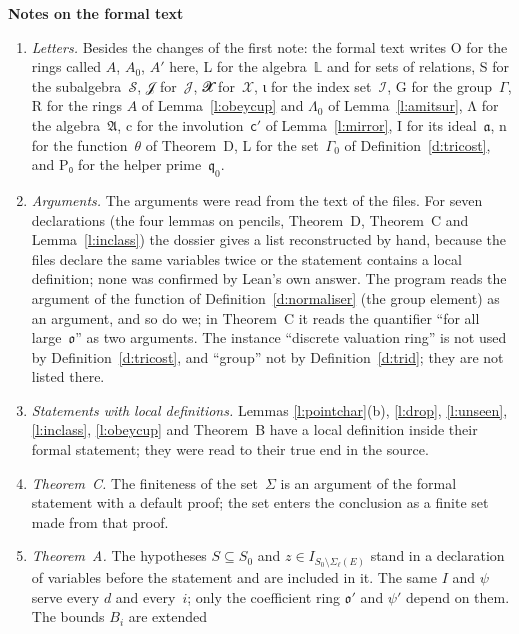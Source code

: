 \documentclass[11pt,a4paper]{article}
\newcommand{\leanfont}{\ttfamily\fontsize{8.6}{10.5}\selectfont\color{leancol}}
\newcommand{\m}[1]{\mbox{$#1$}}        %
\newcommand{\sect}[2]{\refstepcounter{section}\label{#2}\par\addvspace{19pt plus 4pt minus 2pt}\Needspace{7\baselineskip}%
  \noindent\llap{{\fontsize{13.2}{16}\selectfont\bfseries\color{inkfaint}\thesection}\hspace{9pt}}%
  {\fontsize{13.2}{16}\selectfont\bfseries\color{ink}#1}\par\nopagebreak\vspace{-1pt}}
\theoremstyle{plainx}
\theoremstyle{uprightx}
\newcommand{\pd}[2]{\Sigma_{#2}(#1)}
\newcommand{\inab}[1]{I_{#1}}
\newcommand{\fo}{\mathfrak{o}}
\newcommand{\fq}{\mathfrak{q}}
\begin{document}
\sect{Notes on the formal text}{s:notes}
\begin{enumerate}[label=\textup{\arabic*.},leftmargin=1.6em,itemsep=5pt]
\item \emph{Letters.} Besides the changes of the first note: the formal text writes {\leanfont O} for the rings
called $A$, $A_0$, $A'$ here, {\leanfont L} for the algebra~$\mathbb{L}$ and for sets of relations, {\leanfont S}
for the subalgebra~$\mathcal{S}$, {\leanfont 𝒥} for~$\mathcal{J}$, {\leanfont 𝓧} for~$\mathcal{X}$, {\leanfont ι} for the
index set~$\mathcal{I}$, {\leanfont G} for the group~$\Gamma$, {\leanfont R} for the rings $A$ of
Lemma~\ref{l:obeycup} and $\Lambda_0$ of Lemma~\ref{l:amitsur}, {\leanfont Λ} for the algebra~$\mathfrak{A}$,
{\leanfont c} for the involution~$\mathsf{c}'$ of Lemma~\ref{l:mirror}, {\leanfont I} for its ideal~$\mathfrak{a}$,
{\leanfont n} for the function~$\theta$ of Theorem~D, {\leanfont L} for the set~$\Gamma_0$ of
Definition~\ref{d:tricost}, and {\leanfont P₀} for the helper prime~$\fq_0$.
\item \emph{Arguments.} The arguments were read from the text of the files. For seven declarations (the four
lemmas on pencils, Theorem~D, Theorem~C and Lemma~\ref{l:inclass}) the dossier gives a list reconstructed by hand,
because the files declare the same variables twice or the statement contains a local definition; none was
confirmed by Lean's own answer. The program reads the argument of the function of Definition~\ref{d:normaliser}
(the group element) as an argument, and so do we; in Theorem~C it reads the quantifier ``for all large~$\fo$'' as
two arguments. The instance ``discrete valuation ring'' is not used by Definition~\ref{d:tricost}, and
``group'' not by Definition~\ref{d:trid}; they are not listed there.
\item \emph{Statements with local definitions.} Lemmas \ref{l:pointchar}(b), \ref{l:drop}, \ref{l:unseen},
\ref{l:inclass}, \ref{l:obeycup} and Theorem~B have a local definition inside their formal statement; they were
read to their true end in the source.
\item \emph{Theorem~C.} The finiteness of the set~$\Sigma$ is an argument of the formal statement with a default
proof; the set enters the conclusion as a finite set made from that proof.
\item \emph{Theorem~A.} The hypotheses \m{S\subseteq S_0} and \m{z\in\inab{S_0\setminus\pd{E}{\ell}}} stand in a
declaration of variables before the statement and are included in it. The same $I$ and $\psi$ serve every $d$
and every~$i$; only the coefficient ring $\fo'$ and \m{\psi'} depend on them. The bounds $B_i$ are extended

\end{enumerate}
\end{document}
